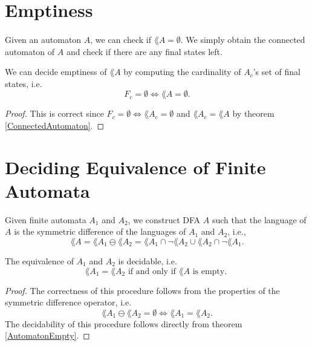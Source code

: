 
            \section{Emptiness}
            \paragraph{}
            Given an automaton $A$, we can check if $\lang{A} = \emptyset$. We simply obtain the connected automaton of $A$ and check if there are any final states left. 
            \begin{theorem} We can decide emptiness of $\lang{A}$ by computing the cardinality of $A_c$'s set of final states, i.e.
                \label{AutomatonEmpty}
                \begin{equation*}        F_c = \emptyset \Longleftrightarrow \lang{A} = \emptyset.       \end{equation*}
                \end{theorem}

                \begin{proof}
                    This is correct since $F_c = \emptyset \Leftrightarrow \lang{A_c} = \emptyset$ and $\lang{A_c} = \lang{A}$ by theorem \ref{ConnectedAutomaton}.
                \end{proof}


                \section{Deciding Equivalence of Finite Automata}
                Given finite automata $A_1$ and $A_2$, we construct DFA $A$ such that the language of $A$ is the symmetric difference of the languages of $A_1$ and $A_2$, i.e.,
                \begin{equation*}          \lang{A} = \lang{A_1} \ominus \lang{A_2} = \lang{A_1} \cap \neg \lang{A_2} \cup \lang{A_2} \cap \neg \lang{A_1}.      \end{equation*}
                    \begin{theorem} The equivalence of $A_1$ and $A_2$ is decidable, i.e.
                        \begin{equation*}                \lang{A_1} = \lang{A_2} \mbox{ if and only if } \lang{A} \mbox{ is empty. }                \end{equation*}
                        \end{theorem}
                        \begin{proof}
                            The correctness of this procedure follows from the properties of the symmetric difference operator, i.e.
                            \begin{equation*}                  \lang{A_1} \ominus \lang{A_2} = \emptyset \Leftrightarrow \lang{A_1} = \lang{A_2}.                  \end{equation*}
                                The decidability of this procedure follows directly from theorem \ref{AutomatonEmpty}.
                            \end{proof}

